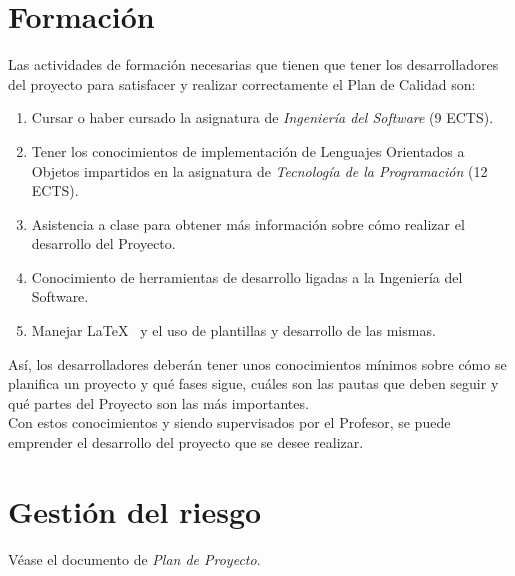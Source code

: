 \documentclass[11pt, a4paper, twoside, titlepage]{article}
\begin{document}
	\section{Formación} %
		Las actividades de formación necesarias que tienen que tener los desarrolladores del proyecto para satisfacer y realizar correctamente el Plan de Calidad son:

		\begin{enumerate}
			\item Cursar o haber cursado la asignatura de \textit{Ingeniería del Software} (9 ECTS).
			\item Tener los conocimientos de implementación de Lenguajes Orientados a Objetos impartidos en la asignatura de \textit{Tecnología de la Programación} (12 ECTS).
			\item Asistencia a clase para obtener más información sobre cómo realizar el desarrollo del Proyecto.
			\item Conocimiento de herramientas de desarrollo ligadas a la Ingeniería del Software.
			\item Manejar {\rmfamily \LaTeX\ } y el uso de plantillas y desarrollo de las mismas.
		\end{enumerate}
		
		Así, los desarrolladores deberán tener unos conocimientos mínimos sobre cómo se planifica un proyecto y qué fases sigue, cuáles son las pautas que deben seguir y qué partes del Proyecto son las más importantes. \\
		Con estos conocimientos y siendo supervisados por el Profesor, se puede emprender el desarrollo del proyecto que se desee realizar.
		
	\section{Gestión del riesgo}
		Véase el documento de \textit{Plan de Proyecto}.
\end{document}
